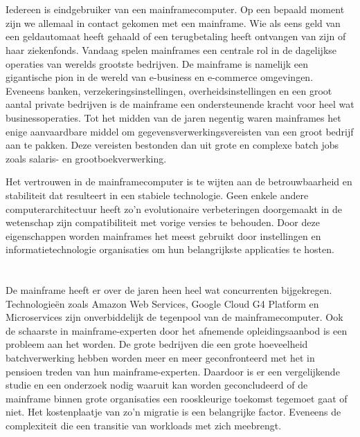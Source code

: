 \section{}
Iedereen is eindgebruiker van een mainframecomputer. Op een bepaald moment zijn we allemaal in contact gekomen met een mainframe. Wie als eens geld van een geldautomaat heeft gehaald of een terugbetaling heeft ontvangen van zijn of haar ziekenfonds. Vandaag spelen mainframes een centrale rol in de dagelijkse operaties van werelds grootste bedrijven. De mainframe is namelijk een gigantische pion in de wereld van e-business en e-commerce omgevingen. Eveneens banken, verzekeringsinstellingen, overheidsinstellingen en een groot aantal private bedrijven is de mainframe een ondersteunende kracht voor heel wat businessoperaties. Tot het midden van de jaren negentig waren mainframes het enige aanvaardbare middel om gegevensverwerkingsvereisten van een groot bedrijf aan te pakken. Deze vereisten bestonden dan uit grote en complexe batch jobs zoals salaris- en grootboekverwerking. 

Het vertrouwen in de mainframecomputer is te wijten aan de betrouwbaarheid en stabiliteit dat resulteert in een stabiele technologie. Geen enkele andere computerarchitectuur heeft zo’n evolutionaire verbeteringen doorgemaakt in de wetenschap zijn compatibiliteit met vorige versies te behouden. Door deze eigenschappen worden mainframes het meest gebruikt door instellingen en informatietechnologie organisaties om hun belangrijkste applicaties te hosten. 


\section{}
\label{sec:probleemstelling}

De mainframe heeft er over de jaren heen heel wat concurrenten bijgekregen. Technologieën zoals Amazon Web Services, Google Cloud G4 Platform en Microservices zijn onverbiddelijk de tegenpool van de mainframecomputer. Ook de schaarste in mainframe-experten door het afnemende opleidingsaanbod is een probleem aan het worden. De grote bedrijven die een grote hoeveelheid batchverwerking hebben worden meer en meer geconfronteerd met het in pensioen treden van hun mainframe-experten. Daardoor is er een vergelijkende studie en een onderzoek nodig waaruit kan worden geconcludeerd of de mainframe binnen grote organisaties een rooskleurige toekomst tegemoet gaat of niet. Het kostenplaatje van zo’n migratie is een belangrijke factor. Eveneens de complexiteit die een transitie van workloads met zich meebrengt.

